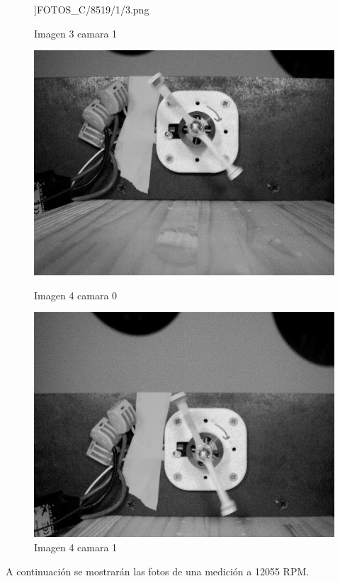 \documentclass{article}
\begin{document}
\begin{figure}[H]
\begin{minipage}[b]{0.45\textwidth}
      \textwidth]{FOTOS_C/8519/1/3.png}
      \caption{Imagen 3 camara 1}
    \end{minipage}
    \begin{minipage}[b]{0.45\textwidth}
      \centering
      \includegraphics[width=0.8
      \textwidth]{FOTOS_C/8519/0/4.png}
      \caption{Imagen 4 camara 0}
    \end{minipage}
    \begin{minipage}[b]{0.45\textwidth}
      \centering
      \includegraphics[width=0.8
      \textwidth]{FOTOS_C/8519/1/4.png}
      \caption{Imagen 4 camara 1}
    \end{minipage}
\end{figure}

\newpage
\noindent A continuación se mostrarán las fotos de una medición a 12055 RPM.
\end{document}
